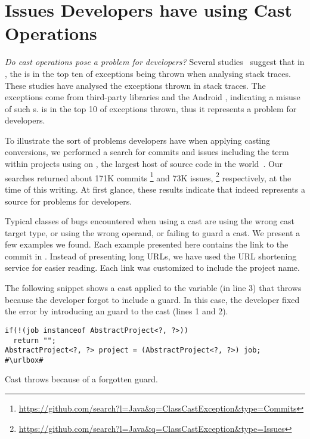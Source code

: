 \section{Issues Developers have using Cast Operations}
\label{sec:casts:issues}

\emph{Do cast operations pose a problem for developers?}
Several studies~\citep{kechagiaUndocumentedUncheckedExceptions2014,coelhoUnveilingExceptionHandling2015,zhitnitskyTop10Exception2016}
suggest that in \java{},
the  is in the top ten of exceptions being thrown when analysing stack traces.
These studies have analysed the exceptions thrown in stack traces.
The exceptions come from third-party libraries and the Android \api{},
indicating a misuse of such \api{}s.
 is in the top 10 of exceptions thrown,
thus it represents a problem for developers.

To illustrate the sort of problems developers have when applying casting conversions,
we performed a search for commits and issues including the term
 within projects using \java{} on \github{},
the largest host of source code in the world~\citep{gousiosLeanGHTorrentGitHub2014}.
Our searches returned about 171K commits%
\footnote{\url{https://github.com/search?l=Java&q=ClassCastException&type=Commits}}
and 73K issues,%
\footnote{\url{https://github.com/search?l=Java&q=ClassCastException&type=Issues}}
respectively, at the time of this writing.
At first glance, these results indicate that  indeed
represents a source for problems for developers.

Typical classes of bugs encountered when using a cast are using the wrong cast target type,
or using the wrong operand, or failing to guard a cast.
We present a few examples we found.
Each example presented here contains the link to the commit in \github{}.
Instead of presenting long \github{} URLs,
we have used the URL shortening service
\href{https://bitly.com/}{\bitly} for easier reading.
Each \bitly{} link was customized to include the project name.

The following snippet shows a cast applied to the variable  (in line 3) that throws  because the developer forgot to include a guard.
In this case, the developer fixed the error by introducing an  guard to the cast (lines 1 and 2).

\def\urlvar{http://bit.ly/jenkinsci_extra_columns_plugin_2vviBuc}
\begin{listing}
\begin{verbatim}
if(!(job instanceof AbstractProject<?, ?>))
  return "";
AbstractProject<?, ?> project = (AbstractProject<?, ?>) job;
#\urlbox#
\end{verbatim}
\caption{Cast throws  because of a forgotten guard.}
\end{listing}

